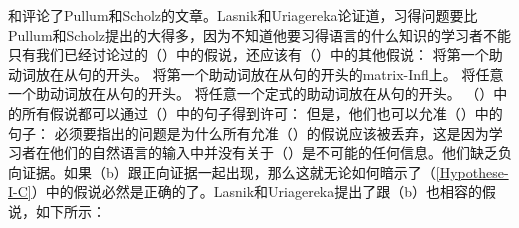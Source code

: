 \citet{LU2002a}和\citet{LY2002a}评论了Pullum和Scholz的文章。Lasnik和Uriagereka论证道，习得问题要比Pullum和Scholz提出的大得多，因为不知道他要习得语言的什么知识的学习者不能只有我们已经讨论过的（）中的假说，还应该有（）中的其他假说：
\eal
\label{Hilfsverbhypothesen}
\ex 将第一个助动词放在从句的开头。
\ex\label{Hypothese-I-C} 
将第一个助动词放在从句的开头的matrix-Infl上。
\zl
\eal
\ex 将任意一个助动词放在从句的开头。
\ex 将任意一个定式的助动词放在从句的开头。
\zl
（）中的所有假说都可以通过（）中的句子得到许可：
\eal
{}
\zl
但是，他们也可以允准（）中的句子：
\z
必须要指出的问题是为什么所有允准（）的假说应该被丢弃，这是因为学习者在他们的自然语言的输入中并没有关于（）是不可能的任何信息。他们缺乏负向证据。如果（b）跟正向证据一起出现，那么这就无论如何暗示了（\ref{Hypothese-I-C}）中的假说必然是正确的了。Lasnik和Uriagereka提出了跟（b）也相容的假说，如下所示：
